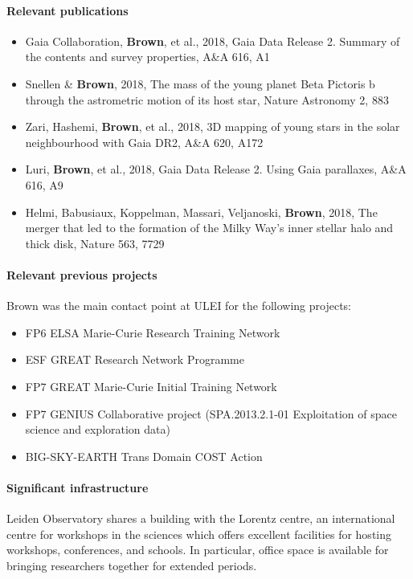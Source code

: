 \paragraph{Relevant publications}
\begin{itemize}
    \item Gaia Collaboration, \textbf{Brown}, et al., 2018, Gaia Data Release 2. Summary of the contents and survey properties, A\&A 616, A1 
    \item Snellen \& \textbf{Brown}, 2018, The mass of the young planet Beta Pictoris b through the astrometric motion of its host star, Nature Astronomy 2, 883 
    \item Zari, Hashemi, \textbf{Brown}, et al., 2018, 3D mapping of young stars in the solar neighbourhood with Gaia DR2, A\&A 620, A172 
    \item  Luri, \textbf{Brown}, et al., 2018, Gaia Data Release 2. Using Gaia parallaxes, A\&A 616, A9 
    \item Helmi, Babusiaux, Koppelman, Massari, Veljanoski, \textbf{Brown}, 2018, The merger that led to the formation of the Milky Way's inner stellar halo and thick disk, Nature 563, 7729 
\end{itemize}

\paragraph{Relevant previous projects}
Brown was the main contact point at ULEI for the following projects:
\begin{itemize}
    \item FP6 ELSA Marie-Curie Research Training Network
    \item ESF GREAT Research Network Programme 
    \item FP7 GREAT Marie-Curie Initial Training Network
    \item FP7 GENIUS Collaborative project (SPA.2013.2.1-01 Exploitation of space science and exploration data)
    \item BIG-SKY-EARTH Trans Domain COST Action
\end{itemize}

\paragraph{Significant infrastructure}
Leiden Observatory shares a building with the Lorentz centre, an international centre for workshops in the sciences which offers excellent facilities for hosting workshops, conferences, and schools. In particular, office space is available for bringing researchers together for extended periods.